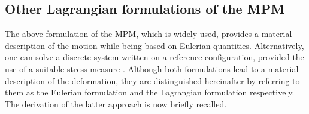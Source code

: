 \subsection{Other Lagrangian formulations of the MPM}
The above formulation of the MPM, which is widely used, provides a material description of the motion while being based on Eulerian quantities.
Alternatively, one can solve a discrete system written on a reference configuration, provided the use of a suitable stress measure \cite{Love}.
Although both formulations lead to a material description of the deformation, they are distinguished hereinafter by referring to them as the Eulerian formulation and the Lagrangian formulation respectively.   
The derivation of the latter approach is now briefly recalled.

